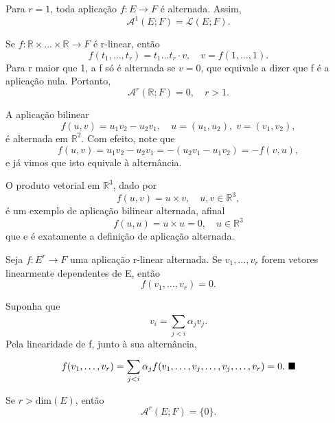 \documentclass[../differential_forms.tex]{subfiles}
\begin{document}
\begin{example}
	Para \(r=1\), toda aplicação \(f:E\rightarrow F\) é alternada. Assim,
	\[
		\mathcal{A}^{1}(E; F)=\mathcal{L}(E; F).
	\]
\end{example}
\begin{example}
	Se \(f:\mathbb{R}\times \dotsc \times \mathbb{R}\rightarrow F\) é r-linear, então
	\[
		f(t_1,\dotsc , t_r)=t_1 \dotsc t_r \cdot v,\quad v=f(1,\dotsc ,1).
	\]
	Para r maior que 1, a f só é alternada se \(v=0\), que equivale a dizer que f é a aplicação nula. Portanto,
	\[
		\mathcal{A}^{r}(\mathbb{R}; F)=0,\quad r>1.
	\]
\end{example}
\begin{example}
	A aplicação bilinear
	\[
		f(u, v)=u_1v_2-u_2v_1,\quad u=(u_1,u_2),\; v=(v_1, v_2),
	\]
	é alternada em \(\mathbb{R}^{2}.\) Com efeito, note que
	\[
		f(u, v)=u_1v_2-u_2v_1 = -(u_2v_1 - u_1v_2) = - f(v, u),
	\]
	e já vimos que isto equivale à alternância.
\end{example}
\begin{example}
	O produto vetorial em \(\mathbb{R}^{3}\), dado por
	\[
		f(u, v)=u \times v,\quad u, v\in \mathbb{R}^{3},
	\]
	é um exemplo de aplicação bilinear alternada, afinal
	\[
		f(u, u) = u \times u = 0, \quad u\in \mathbb{R}^{3}
	\]
	que e é exatamente a definição de aplicação alternada.
\end{example}
\begin{prop*}
	Seja \(f:E^{r}\rightarrow F\) uma aplicação r-linear alternada. Se \(v_1,\dotsc ,v_r\) forem vetores linearmente dependentes de E, então
	\[
		f(v_1,\dotsc , v_r)=0.
	\]
\end{prop*}
\begin{proof*}
	Suponha que
	\[
		v_{i} = \sum\limits_{j<i}^{}\alpha_{j}v_{j}.
	\]
	Pela linearidade de f, junto à sua alternância,
	\[
		f(v_1,\dotsc ,v_r)=\sum\limits_{j<i}^{}\alpha_{j}f(v_1,\dotsc , v_{j},\dotsc , v_{j}, \dotsc , v_r)=0. \text{ $\blacksquare$}
	\]
\end{proof*}
\begin{crl*}
	Se \(r>\mathrm{dim}(E)\), então
	\[
		\mathcal{A}^{r}(E; F)=\{0\}.
	\]
\end{crl*}
\end{document}
